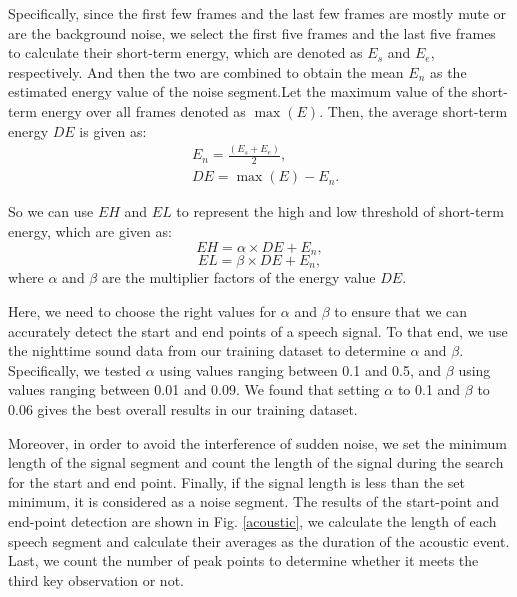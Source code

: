 Specifically, since the first few frames and the last few frames are mostly mute or are the background noise, we select the first five
frames and the last five frames to calculate their short-term energy, which are denoted as $E_s$ and $E_e$, respectively. And then the two
are combined to obtain the mean $E_n$ as the estimated energy value of the noise segment.Let the maximum value of the short-term energy
over all frames denoted as $\max (E)$. Then, the average short-term energy $DE$ is given as:
\begin{eqnarray}
      &E_n = \frac{(E_s+E_e)}{2}, \\
      &DE = \max (E)-E_n.\label{eq:DE}
\end{eqnarray}

So we can use $EH$ and $EL$ to represent the high and low threshold of short-term energy, which are given as:
\begin{equation}
      EH=\alpha \times DE+E_n,
\end{equation}
\begin{equation}
    EL=\beta \times DE+E_n,
\end{equation}
where $\alpha$ and $\beta$ are the multiplier factors of the energy value $DE$.


Here, we need to choose the right values for $\alpha$ and $\beta$ to ensure
 that we can accurately detect the start and end points of a speech signal. To that end, we use the nighttime sound data from our training dataset to determine $\alpha$ and $\beta$.
 Specifically, we tested $\alpha$ using values ranging between 0.1 and 0.5, and $\beta$ using values ranging between 0.01 and 0.09. We found that setting $\alpha$ to  0.1 and $\beta$ to  0.06 gives the best overall results in our training dataset.

 Moreover, in order to avoid the interference of sudden noise, we set the minimum length of the signal segment and count the length of the signal during the search for the start and end point. Finally, if the signal length is less than the set minimum, it is considered as a noise segment. The results of the start-point and end-point detection are shown in Fig. \ref{acoustic}, we calculate the length of each speech segment and calculate their averages as the duration of the acoustic event. Last, we count the number of peak points to determine whether it meets the third key observation or not.





